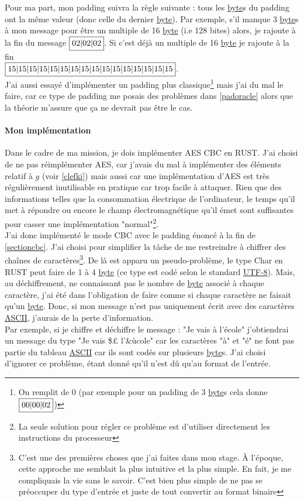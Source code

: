 \documentclass[a4paper, 12pt]{article}
\begin{document}
Pour ma part, mon padding suivra la règle suivante : tous les \hyperref[byte]{byte}s du padding ont la même valeur (donc celle du dernier \hyperref[byte]{byte}).
Par exemple, s'il manque 3 \hyperref[byte]{byte}s à mon message pour être un multiple de 16 \hyperref[byte]{byte} (i.e 128 bites) alors, je rajoute à la fin du message $\fbox{02|02|02}$. Si c'est déjà un multiple de 16 \hyperref[byte]{byte} je rajoute à la fin\\ $\fbox{15|15|15|15|15|15|15|15|15|15|15|15|15|15|15|15}$.\\

J'ai aussi essayé d'implémenter un padding plus classique\footnote{On remplit de $0$ (par exemple pour un padding de 3 \hyperref[byte]{byte}s cela donne $\fbox{00|00|02}$)} mais j'ai du mal le faire, car ce type de padding me posais des problèmes dans \ref{padoracle} alors que la théorie m'assure que ça ne devrait pas être le cas. 

\paragraph{Mon implémentation}
Dans le cadre de ma mission, je dois implémenter AES CBC en RUST. 
J'ai choisi de ne pas réimplémenter AES, car j'avais du mal à implémenter des éléments relatif à $g$ (voir \ref{clefki}) mais aussi car une implémentation d'AES est très régulièrement inutilisable en pratique car trop facile à attaquer. Rien que des informations telles que la consommation électrique de l'ordinateur, le temps qu'il met à répondre ou encore le champ électromagnétique qu'il émet sont suffisantes pour casser une implémentation "normal"\footnote{La seule solution pour régler ce problème est d'utiliser directement les instructions du processeur}. \\

J'ai donc implémenté le mode CBC avec le padding énoncé à la fin de \ref{sectioncbc}. J'ai choisi pour simplifier la tâche de me restreindre à chiffrer des chaînes de caractères\footnote{C'est une des premières choses que j'ai faites dans mon stage. À l'époque, cette approche me semblait la plus intuitive et la plus simple. En fait, je me compliquais la vie sans le savoir. C'est bien plus simple de ne pas se préoccuper du type d'entrée et juste de tout convertir au format binaire}. De là est apparu un pseudo-problème, le type Char en RUST peut faire de 1 à 4 \hyperref[byte]{byte} (ce type est codé selon le standard \hyperref[utf]{UTF-8}). Mais, au déchiffrement, ne connaissant pas le nombre de \hyperref[byte]{byte} associé à chaque caractère, j'ai été dans l'obligation de faire comme si chaque caractère ne faisait qu'un \hyperref[byte]{byte}. Donc, si mon message n'est pas uniquement écrit avec des caractères \hyperref[ASCII]{ASCII}, j'aurais de la perte d'information. \\
Par exemple, si je chiffre et déchiffre le message : "Je vais à l'école" j'obtiendrai un message du type "Je vais \$£ l'\&ùcole" car les caractères "à" et "é" ne font pas partie du tableau \hyperref[ASCII]{ASCII} car ils sont codés sur plusieurs \hyperref[byte]{byte}s. 
J'ai choisi d'ignorer ce problème, étant donné qu'il n'est dû qu'au format de l'entrée.
\end{document}
